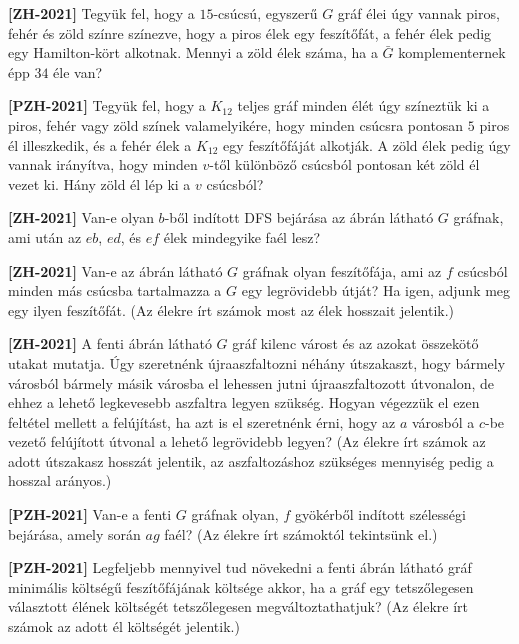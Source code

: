 \documentclass[a4paper, 12pt]{article}
\begin{document}
    \noindent{}
    \noindent{}

    \begin{enumerate}
        \item \textbf{[ZH-2021]} Tegyük fel, hogy a $15$-csúcsú, egyszerű $G$ gráf élei úgy vannak piros, fehér és zöld színre színezve, hogy a piros élek egy feszítőfát, a fehér élek pedig egy Hamilton-kört alkotnak. Mennyi a zöld élek száma, ha a $\bar{G}$ komplementernek épp $34$ éle van?
        \item \textbf{[PZH-2021]} Tegyük fel, hogy a $K_{12}$ teljes gráf minden élét úgy színeztük ki a piros, fehér vagy zöld színek valamelyikére, hogy minden csúcsra pontosan $5$ piros él illeszkedik, és a fehér élek a $K_{12}$ egy feszítőfáját alkotják. A zöld élek pedig úgy vannak irányítva, hogy minden $v$-től különböző csúcsból pontosan két zöld él vezet ki. Hány zöld él lép ki a $v$ csúcsból?

        \begin{minipage}{0.6\textwidth}
            \item \textbf{[ZH-2021]} Van-e olyan $b$-ből indított DFS bejárása az ábrán látható $G$ gráfnak, ami után az $eb$, $ed$, és $ef$ élek mindegyike faél lesz?
            \item \textbf{[ZH-2021]} Van-e az ábrán látható $G$ gráfnak olyan feszítőfája, ami az $f$ csúcsból minden más csúcsba tartalmazza a $G$ egy legrövidebb útját? Ha igen, adjunk meg egy ilyen feszítőfát. (Az élekre írt számok most az élek hosszait jelentik.)
        \end{minipage}
        \begin{minipage}{0.3\textwidth}
                \centering
                
        \end{minipage}
        \item \textbf{[ZH-2021]} A fenti ábrán látható $G$ gráf kilenc várost és az azokat összekötő utakat mutatja. Úgy szeretnénk újraaszfaltozni néhány útszakaszt, hogy bármely városból bármely másik városba el lehessen jutni újraaszfaltozott útvonalon, de ehhez a lehető legkevesebb aszfaltra legyen szükség. Hogyan végezzük el ezen feltétel mellett a felújítást, ha azt is el szeretnénk érni, hogy az $a$ városból a $c$-be vezető felújított útvonal a lehető legrövidebb legyen? (Az élekre írt számok az adott útszakasz hosszát jelentik, az aszfaltozáshoz szükséges mennyiség pedig a hosszal arányos.)
        \item \textbf{[PZH-2021]} Van-e a fenti $G$ gráfnak olyan, $f$ gyökérből indított szélességi bejárása, amely során $ag$ faél? (Az élekre írt számoktól tekintsünk el.)
        \item \textbf{[PZH-2021]} Legfeljebb mennyivel tud növekedni a fenti ábrán látható gráf minimális költségű feszítőfájának költsége akkor, ha a gráf egy tetszőlegesen választott élének költségét tetszőlegesen megváltoztathatjuk? (Az élekre írt számok az adott él költségét jelentik.)
        

\end{enumerate}
\end{document}
